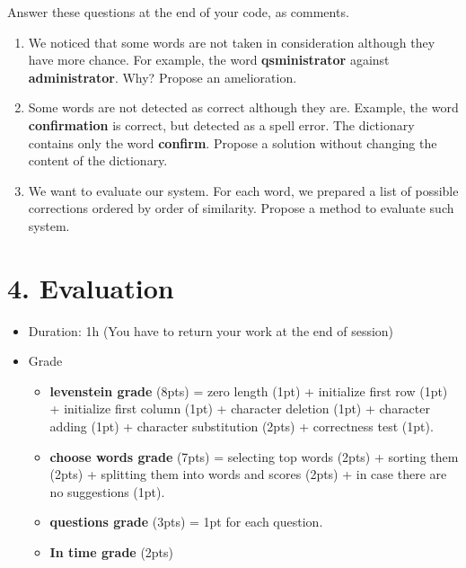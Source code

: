 \documentclass[11pt, a4paper]{article}
\begin{document}
Answer these questions at the end of your code, as comments.
\begin{enumerate}
	\item We noticed that some words are not taken in consideration although they have more chance.
	For example, the word \textbf{qsministrator} against \textbf{administrator}. 
	Why? Propose an amelioration.
	
	\item Some words are not detected as correct although they are.
	Example, the word \textbf{confirmation} is correct, but detected as a spell error.
	The dictionary contains only the word \textbf{confirm}.
	Propose a solution without changing the content of the dictionary.
	
	\item We want to evaluate our system. 
	For each word, we prepared a list of possible corrections ordered by order of similarity.
	Propose a method to evaluate such system.
	
\end{enumerate}


\section*{4. Evaluation}

\begin{itemize}
	\item Duration: 1h (You have to return your work at the end of session)
	\item Grade
	\begin{itemize}
		\item \textbf{levenstein grade} (8pts) = zero length (1pt) + initialize first row (1pt) + initialize first column (1pt) + character deletion (1pt) + character adding (1pt) + character substitution (2pts) + correctness test (1pt).
		\item \textbf{choose words grade} (7pts) = selecting top words (2pts) + sorting them (2pts) + splitting them into words and scores (2pts) + in case there are no suggestions (1pt).
		\item \textbf{questions grade} (3pts) = 1pt for each question.
		\item \textbf{In time grade} (2pts)
	\end{itemize}
\end{itemize}
\end{document}
